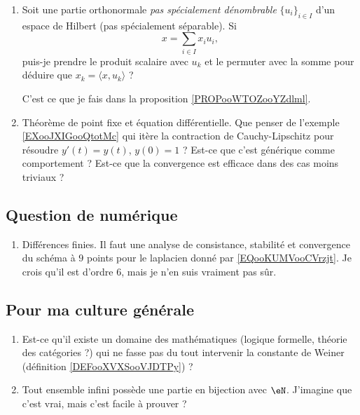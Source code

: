 \begin{enumerate}
    \item
        Soit une partie orthonormale \emph{pas spécialement dénombrable} \( \{ u_i \}_{i\in I}\) d'un espace de Hilbert (pas spécialement séparable). Si
        \begin{equation}
            x=\sum_{i\in I}x_iu_i,
        \end{equation}
        puis-je prendre le produit scalaire avec \( u_{k}\) et le permuter avec la somme pour déduire que \( x_k=\langle x, u_k\rangle \) ?

        C'est ce que je fais dans la proposition \ref{PROPooWTOZooYZdlml}. 
    \item 
        Théorème de point fixe et équation différentielle. Que penser de l'exemple \ref{EXooJXIGooQtotMc} qui itère la contraction de Cauchy-Lipschitz pour résoudre \( y'(t)=y(t)\), \( y(0)=1\) ? Est-ce que c'est générique comme comportement ? Est-ce que la convergence est efficace dans des cas moins triviaux ?
\end{enumerate}

\subsection{Question de numérique}

\begin{enumerate}
    \item
        Différences finies. Il faut une analyse de consistance, stabilité et convergence du schéma à \( 9\) points pour le laplacien donné par \eqref{EQooKUMVooCVrzjt}. Je crois qu'il est d'ordre \( 6\), mais je n'en suis vraiment pas sûr.
\end{enumerate}

\subsection{Pour ma culture générale}

\begin{enumerate}
    \item
        Est-ce qu'il existe un domaine des mathématiques (logique formelle, théorie des catégories ?) qui ne fasse pas du tout intervenir la constante de Weiner (définition \ref{DEFooXVXSooVJDTPy}) ?
    \item
        Tout ensemble infini possède une partie en bijection avec \( \eN\). J'imagine que c'est vrai, mais c'est facile à prouver ?
\end{enumerate}
